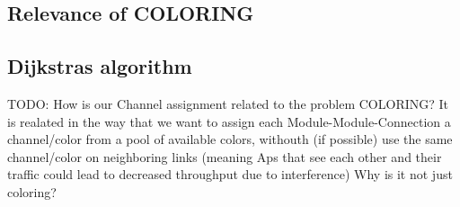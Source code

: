    \subsection{Relevance of COLORING}
   \subsection{Dijkstras algorithm}
   TODO: How is our Channel assignment related to the problem COLORING?
    It is realated in the way that we want to assign each Module-Module-Connection a channel/color from a pool of available colors, withouth (if possible) use the same channel/color on neighboring links (meaning Aps that see each other and their traffic could lead to decreased throughput due to interference)
    Why is it not just coloring?
